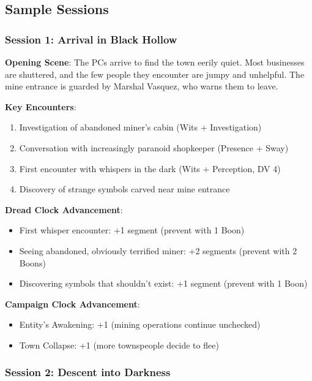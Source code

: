 \documentclass[11pt]{article}
\begin{document}
\subsection*{Sample Sessions}

\subsubsection*{Session 1: Arrival in Black Hollow}

\textbf{Opening Scene}: The PCs arrive to find the town eerily quiet. Most businesses are shuttered, and the few people they encounter are jumpy and unhelpful. The mine entrance is guarded by Marshal Vasquez, who warns them to leave.

\textbf{Key Encounters}:
\begin{enumerate}[leftmargin=*]
\item Investigation of abandoned miner's cabin (Wits + Investigation)
\item Conversation with increasingly paranoid shopkeeper (Presence + Sway)
\item First encounter with whispers in the dark (Wits + Perception, DV 4)
\item Discovery of strange symbols carved near mine entrance
\end{enumerate}

\textbf{Dread Clock Advancement}: 
\begin{itemize}[leftmargin=*]
\item First whisper encounter: +1 segment (prevent with 1 Boon)
\item Seeing abandoned, obviously terrified miner: +2 segments (prevent with 2 Boons)
\item Discovering symbols that shouldn't exist: +1 segment (prevent with 1 Boon)
\end{itemize}

\textbf{Campaign Clock Advancement}:
\begin{itemize}[leftmargin=*]
\item Entity's Awakening: +1 (mining operations continue unchecked)
\item Town Collapse: +1 (more townspeople decide to flee)
\end{itemize}

\subsubsection*{Session 2: Descent into Darkness}
\end{document}
